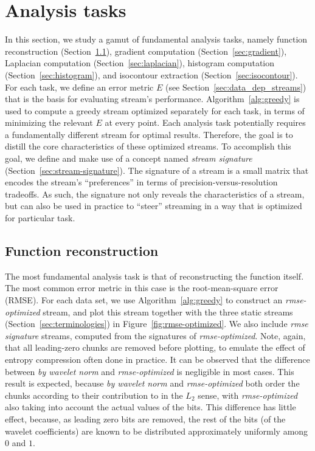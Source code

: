 \section{Analysis tasks}
\label{sec:analysis-tasks}

In this section, we study a gamut of fundamental analysis tasks, namely function reconstruction
(Section~\ref{sec:rmse-optimized}), gradient computation (Section~\ref{sec:gradient}), Laplacian
computation (Section~\ref{sec:laplacian}), histogram computation (Section~\ref{sec:histogram}), and
isocontour extraction (Section~\ref{sec:isocontour}). For each task, we define an error metric $E$
(see Section~\ref{sec:data_dep_streams}) that is the basis for evaluating stream's performance.
Algorithm~\ref{alg:greedy} is used to compute a greedy stream optimized separately for each task, in
terms of minimizing the relevant $E$ at every point. Each analysis task potentially requires a
fundamentally different stream for optimal results. Therefore, the goal is to distill the core
characteristics of these optimized streams. To accomplish this goal, we define and make use of a
concept named \emph{stream signature} (Section~\ref{sec:stream-signature}). The signature of a
stream is a small matrix that encodes the stream's ``preferences'' in terms of
precision-versus-resolution tradeoffs. As such, the signature not only reveals the characteristics
of a stream, but can also be used in practice to ``steer'' streaming in a way that is optimized for
particular task.

\subsection{Function reconstruction}
\label{sec:rmse-optimized}

The most fundamental analysis task is that of reconstructing the function itself. The most common
error metric in this case is the root-mean-square error (RMSE). For each data set, we use
Algorithm~\ref{alg:greedy} to construct an \emph{rmse-optimized} stream, and plot this stream
together with the three static streams (Section~\ref{sec:terminologies}) in
Figure~\ref{fig:rmse-optimized}. We also include \emph{rmse signature} streams, computed from the
signatures of \emph{rmse-optimized}. Note, again, that all leading-zero chunks are removed before
plotting, to emulate the effect of entropy compression often done in practice. It can be observed
that the difference between \emph{by wavelet norm} and \emph{rmse-optimized} is negligible in most
cases. This result is expected, because \emph{by wavelet norm} and \emph{rmse-optimized} both order
the chunks according to their contribution to in the $L_2$ sense, with \emph{rmse-optimized} also
taking into account the actual values of the bits. This difference has little effect, because, as
leading zero bits are removed, the rest of the bits (of the wavelet coefficients) are known to be
distributed approximately uniformly among $0$ and $1$.

